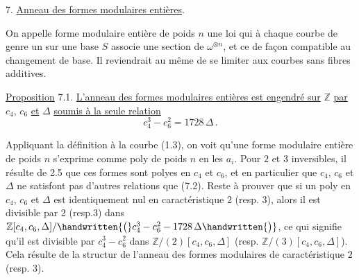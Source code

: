 7. \quad \uline{Anneau des formes modulaires entières}.

On appelle forme modulaire entière de poids $n$ une loi qui à chaque courbe de genre un sur une base $S$ associe une section de $\omega^{\otimes n}$, et ce de façon compatible au changement de base. Il reviendrait au même de se limiter aux courbes sans fibres additives.

\uline{Proposition} 7.1. \quad \uline{L'anneau des formes modulaires entières est engendré sur} $\mathbb{Z}$ \uline{par} $c_4$, $c_6$ \uline{et} $\Delta$ \uline{soumis à la seule relation}
\[
c_4^3-c_6^2=1728\,\Delta \, . \tag*{(7.2.)}
\]

Appliquant la définition à la courbe (1.3), on voit qu'une forme modulaire entière de poids $n$ s'exprime comme poly de poids $n$ en les $a_i$. Pour $2$ et $3$ inversibles, il résulte de 2.5 que ces formes sont  polyes en $c_4$ et $c_6$, et en particulier que $c_4$, $c_6$ et $\Delta$ ne satisfont pas d'autres relations que (7.2). Reste à prouver que si un poly en $c_4$, $c_6$ et $\Delta$ est identiquement nul en caractéristique $2$ (resp. $3$), alors il est divisible par $2$ (resp.$3$) dans $\mathbb{Z}[c_4,c_6,\Delta]/\handwritten{\bigl(}c_4^3-c_6^2-1728\,\Delta\handwritten{\bigr)}$, ce qui signifie%
%
\space
qu'il est divisible par $c_4^3-c_6^2$ dans $\mathbb{Z}/(2)[c_4,c_6,\Delta]$ (resp. $\mathbb{Z}/(3)[c_4,c_6,\Delta]$). Cela résulte de la structur de l'anneau des formes modulaires de caractéristique $2$ (resp. $3$).

